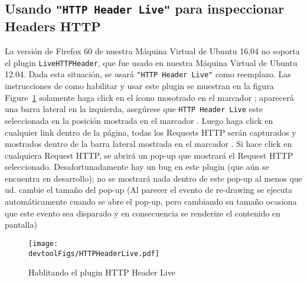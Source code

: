 
\newcommand{\devtoolFigs}{../Web_Common/Figs}


\subsection{Usando \texttt{"HTTP Header Live"} para inspeccionar Headers HTTP}
\label{web:sec:httpheaderlive}

La versión de Firefox 60 de nuestra Máquina Virtual de Ubuntu 16.04 no soporta el plugin \texttt{LiveHTTPHeader}, que fue usado en nuestra Máquina Virtual de Ubuntu 12.04.
Dada esta situación, se usará \texttt{"HTTP Header Live"} como reemplazo.
Las instrucciones de como habilitar y usar este plugin se muestran en la figura Figure~\ref{web:fig:httpheader} solamente haga click en el ícono mosotrado en el marcador ; aparecerá una barra lateral en la izquierda, asegúrese que \texttt{HTTP Header Live} este seleccionada en la posición mostrada en el marcador . Luego haga click en cualquier link dentro de la página, todas los Requests HTTP serán capturados y mostrados dentro de la barra lateral mostrada en el marcador  .
Si hace click en cualquiera Request HTTP, se abrirá un pop-up que mostrará el Request HTTP seleccionado. Desafortunadamente hay un bug en este plugin (que aún se encuentra en desarrollo); no se mostrará nada dentro de este pop-up al menos que ud. cambie el tamaño del pop-up (Al parecer el evento de re-drawing se ejecuta automáticamente cuando se abre el pop-up, pero cambiando su tamaño ocasiona que este evento sea disparado y en consecuencia se renderize el contenido en pantalla)


\begin{figure}[htb]
\begin{center}
\texttt{[image: \\devtoolFigs/HTTPHeaderLive.pdf]}
\end{center}
\caption{Hablitando el plugin HTTP Header Live}
\label{web:fig:httpheader}
\end{figure}




